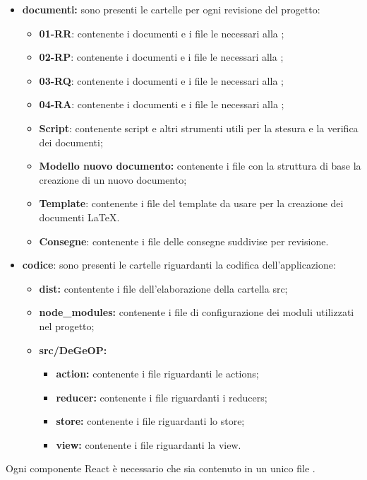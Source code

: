   \begin{itemize}
  	\item \textbf{documenti:} sono presenti le cartelle per ogni revisione del progetto:
  	\begin{itemize}
  		\item \textbf{01-RR}: contenente i documenti e i file le necessari alla \revereq;
  		\item \textbf{02-RP}: contenente i documenti e i file le necessari alla \revprog;
  		\item \textbf{03-RQ}: contenente i documenti e i file le necessari alla \revaqual;
  		\item \textbf{04-RA}: contenente i documenti e i file le necessari alla \revacc;
  		\item \textbf{Script}: contenente script e altri strumenti utili per la stesura e la verifica dei documenti;
  		\item \textbf{Modello nuovo documento:} contenente i file con la struttura di base la creazione di un nuovo documento;
  		\item \textbf{Template}: contenente i file del template da usare per la creazione dei documenti \LaTeX.
  		\item \textbf{Consegne}: contenente i file delle consegne suddivise per revisione.
  	\end{itemize}
  	\item \textbf{codice}: sono presenti le cartelle riguardanti la codifica dell'applicazione:
  		\begin{itemize}
  			\item \textbf{dist:} contentente i file dell'elaborazione della cartella src;
  			\item \textbf{node\_modules:} contenente i file di configurazione dei moduli utilizzati nel progetto;
  			\item \textbf{src/DeGeOP:}
  				\begin{itemize}
  					\item \textbf{action:} contenente i file riguardanti le actions;
					\item \textbf{reducer:} contenente i file riguardanti i reducers;
					\item \textbf{store:} contenente i file riguardanti lo store;
					\item \textbf{view:} contenente i file riguardanti la view.
  				\end{itemize}
  		\end{itemize}
  	\end{itemize}
	Ogni componente React è necessario che sia contenuto in un unico file \js.
  
